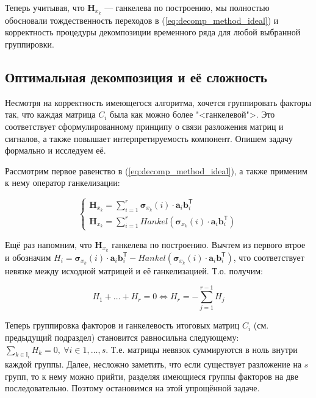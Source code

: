 	    	Теперь учитывая, что $ \mathbf{H}_{x_k} $ --- ганкелева по построению, мы полностью обосновали тождественность переходов в (\ref{eq:decomp_method_ideal}) и корректность процедуры декомпозиции временного ряда для любой выбранной группировки.
	    	
	    \subsection*{Оптимальная декомпозиция и её сложность}\label{sec:optimal_decomp}
	    	
	    	Несмотря на корректность имеющегося алгоритма, хочется группировать факторы так, что каждая матрица $ C_i $ была как можно более "<ганкелевой">. Это соответствует сформулированному принципу о связи разложения матриц и сигналов, а также повышает интерпретируемость компонент. Опишем задачу формально и исследуем её.
	    	
	    	Рассмотрим первое равенство в (\ref{eq:decomp_method_ideal}), а также применим к нему оператор ганкелизации:
	    	
	    	\begin{equation*}
	    		\begin{cases*}
	    			\mathbf{H}_{x_k} = \sum\limits_{i = 1}^{r} \boldsymbol{\sigma}_{x_k}(i) \cdot \mathbf{a}_i  \mathbf{b}_i^{\mathsf{T}} \\
	    			\mathbf{H}_{x_k} = \sum\limits_{i = 1}^{r} Hankel(\boldsymbol{\sigma}_{x_k}(i) \cdot \mathbf{a}_i  \mathbf{b}_i^{\mathsf{T}})
	    		\end{cases*}
	    	\end{equation*}
	    	
	    	Ещё раз напомним, что $ \mathbf{H}_{x_k} $ ганкелева по построению. Вычтем из первого втрое и обозначим $ H_i = \boldsymbol{\sigma}_{x_k}(i) \cdot \mathbf{a}_i  \mathbf{b}_i^{\mathsf{T}} - Hankel(\boldsymbol{\sigma}_{x_k}(i) \cdot \mathbf{a}_i  \mathbf{b}_i^{\mathsf{T}}) $, что соответствует невязке между исходной матрицей и её ганкелизацией. Т.о. получим:
	    	
	    	\begin{equation}\label{eq:residuals_equation}
	    		H_1 + \ldots + H_r = 0 \Leftrightarrow H_r = - \sum\limits_{j = 1}^{r - 1} H_j
	    	\end{equation}
	    	
	    	Теперь группировка факторов и ганкелевость итоговых матриц $ C_i $ (см. предыдущий подраздел) становится равносильна следующему: $ \sum_{k \in \mathbb{I}_i} H_k = 0, \  \forall i \in 1, \ldots, s $. Т.е. матрицы невязок суммируются в ноль внутри каждой группы. Далее, несложно заметить, что если существует разложение на $ s $ групп, то к нему можно прийти, разделяя имеющиеся группы факторов на две последовательно. Поэтому остановимся на этой упрощённой задаче.
	    	
